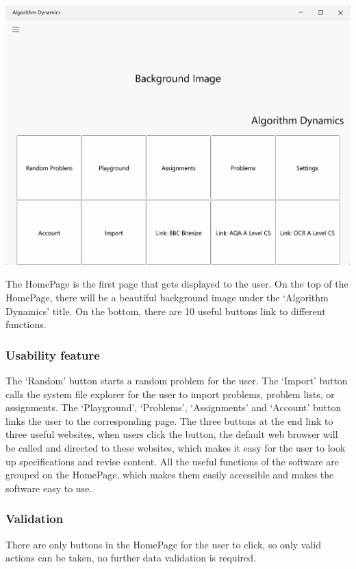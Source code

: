 \documentclass[a4paper]{report}
\begin{document}
\includegraphics[width=\textwidth, height=\textheight, keepaspectratio]{HomePage-design}

The HomePage is the first page that gets displayed to the user. On the top of the HomePage, there will be a beautiful background image under the `Algorithm Dynamics' title. On the bottom, there are 10 useful buttons link to different functions.

\subsubsection{Usability feature}

The `Random' button starts a random problem for the user. The `Import' button calls the system file explorer for the user to import problems, problem lists, or assignments. The `Playground', `Problems', `Assignments' and `Account' button links the user to the corresponding page. The three buttons at the end link to three useful websites, when users click the button, the default web browser will be called and directed to these websites, which makes it easy for the user to look up specifications and revise content. All the useful functions of the software are grouped on the HomePage, which makes them easily accessible and makes the software easy to use.

\subsubsection{Validation}

There are only buttons in the HomePage for the user to click, so only valid actions can be taken, no further data validation is required.
\end{document}
